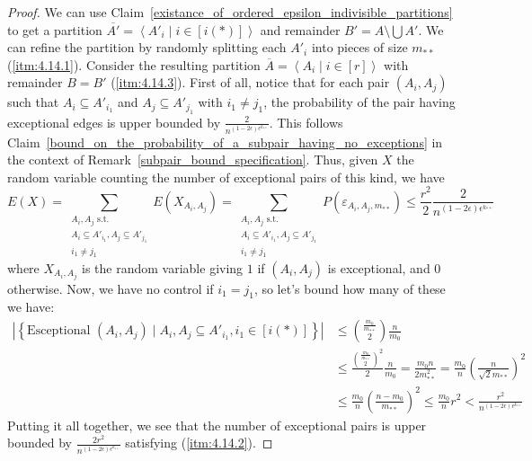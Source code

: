         \begin{proof}
            We can use Claim~\ref{existance_of_ordered_epsilon_indivisible_partitions} to get a partition
                $\overline{A'} = \left< A'_i \mid i \in [i(*)] \right>$ and remainder $B' = A \setminus \bigcup A'$.
            We can refine the partition by randomly splitting each $A'_i$ into pieces of size $m_{**}$ (\ref{itm:4.14.1}).
            Consider the resulting partition $\overline{A} = \left< A_i \mid i \in [r] \right>$ with remainder $B = B'$
                (\ref{itm:4.14.3}).
            First of all, notice that for each pair $(A_i, A_j)$ such that $A_i \subseteq A'_{i_1}$ and
                $A_j \subseteq A'_{j_1}$ with $i_1 \neq j_1$, the probability of the pair having exceptional edges is
                upper bounded by $\frac{2}{n^{(1-2\epsilon)\epsilon^{k_{**}}}}$.
            This follows Claim~\ref{bound_on_the_probability_of_a_subpair_having_no_exceptions} in the context of
                Remark~\ref{subpair_bound_specification}.
            Thus, given $X$ the random variable counting the number of exceptional pairs of this kind, we have
            \[
                E(X) = \sum_{\substack{A_i,A_j \text{ s.t.}\\A_i\subseteq A'_{i_1},A_j\subseteq A'_{j_1}\\i_1\neq j_1}} E(X_{A_i, A_j})
                    = \sum_{\substack{A_i,A_j \text{ s.t.}\\A_i\subseteq A'_{i_1},A_j\subseteq A'_{j_1}\\i_1\neq j_1}} P(\varepsilon_{A_i, A_j,m_{**}})
                    \leq \frac{r^2}{2} \frac{2}{n^{(1-2\epsilon)\epsilon^{k_{**}}}}
            \]
                where $X_{A_i,A_j}$ is the random variable giving $1$ if $(A_i, A_j)$ is exceptional, and $0$ otherwise.
            Now, we have no control if $i_1 = j_1$, so let's bound how many of these we have:
            \[
                \begin{split}
                    |\left\{ \text{Esceptional } (A_i, A_j) \mid A_i, A_j \subseteq A'_{i_1}, i_1 \in [i(*)] \right\}|
                        & \leq {\frac{m_0}{m_{**}} \choose 2} \frac{n}{m_0} \\
                        & \leq \frac{{\frac{m_0}{m_{**}} \choose 2}^2}{2} \frac{n}{m_0}
                            = \frac{m_0 n}{2 m_{**}^2}
                            = \frac{m_0}{n} \left( \frac{n}{\sqrt{2}m_{**}} \right)^2 \\
                        & \leq \frac{m_0}{n} \left( \frac{n - m_0}{m_{**}} \right)^2
                            \leq \frac{m_0}{n} r^2
                            < \frac{r^2}{n^{(1-2\epsilon) \epsilon^{k_{**}}}}
                \end{split}
            \]
            Putting it all together, we see that the number of exceptional pairs is upper bounded by
                $\frac{2r^2}{n^{(1-2\epsilon)\epsilon^{k_{**}}}}$ satisfying (\ref{itm:4.14.2}).
        \end{proof}

